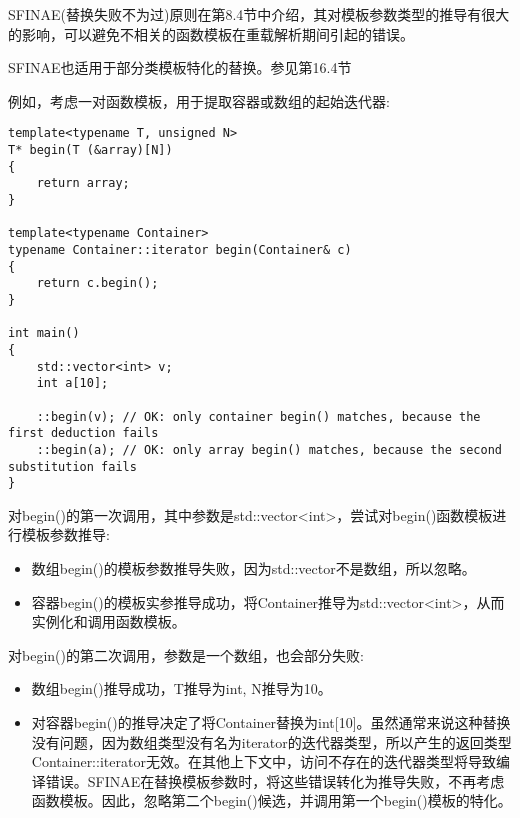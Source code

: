 

SFINAE(替换失败不为过)原则在第8.4节中介绍，其对模板参数类型的推导有很大的影响，可以避免不相关的函数模板在重载解析期间引起的错误。

\begin{tcolorbox}[colback=webgreen!5!white,colframe=webgreen!75!black]
\hspace*{0.75cm}SFINAE也适用于部分类模板特化的替换。参见第16.4节
\end{tcolorbox}

例如，考虑一对函数模板，用于提取容器或数组的起始迭代器:

\begin{lstlisting}[style=styleCXX]
template<typename T, unsigned N>
T* begin(T (&array)[N])
{
	return array;
}

template<typename Container>
typename Container::iterator begin(Container& c)
{
	return c.begin();
}

int main()
{
	std::vector<int> v;
	int a[10];
	
	::begin(v); // OK: only container begin() matches, because the first deduction fails
	::begin(a); // OK: only array begin() matches, because the second substitution fails
}
\end{lstlisting}

对begin()的第一次调用，其中参数是std::vector<int>，尝试对begin()函数模板进行模板参数推导:

\begin{itemize}
\item 
数组begin()的模板参数推导失败，因为std::vector不是数组，所以忽略。

\item 
容器begin()的模板实参推导成功，将Container推导为std::vector<int>，从而实例化和调用函数模板。
\end{itemize}

对begin()的第二次调用，参数是一个数组，也会部分失败:

\begin{itemize}
\item 
数组begin()推导成功，T推导为int, N推导为10。

\item 
对容器begin()的推导决定了将Container替换为int[10]。虽然通常来说这种替换没有问题，因为数组类型没有名为iterator的迭代器类型，所以产生的返回类型Container::iterator无效。在其他上下文中，访问不存在的迭代器类型将导致编译错误。SFINAE在替换模板参数时，将这些错误转化为推导失败，不再考虑函数模板。因此，忽略第二个begin()候选，并调用第一个begin()模板的特化。
\end{itemize}

